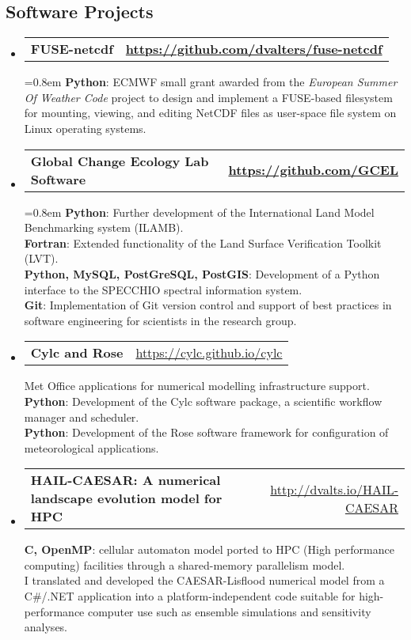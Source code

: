 \documentclass[10.5pt,a4]{article}
\makeatletter
\newcommand{\headerrow}[2]
{\begin{tabular*}{\linewidth}{l@{\extracolsep{\fill}}r}
	#1 &
	#2 \\
\end{tabular*}}
\newcommand{\CPP}
{C\nolinebreak[4]\hspace{-.05em}\raisebox{.22ex}{\footnotesize\bf ++}}
\makeatother
\begin{document}
\subsection*{Software Projects}
\begin{itemize}
	\parskip=0.1em

\item
\headerrow
		{\textbf{FUSE-netcdf}}
		{\textbf{\url{https://github.com/dvalters/fuse-netcdf}}}

		\parskip=0.8em
		\textbf{Python}: ECMWF small grant awarded from the \textit{European Summer Of Weather Code} project to design and implement a FUSE-based filesystem for mounting, viewing, and editing NetCDF files as user-space file system on Linux operating systems.

	\item
	\headerrow
		{\textbf{Global Change Ecology Lab Software}}
		{\textbf{\url{https://github.com/GCEL}}}

		\parskip=0.8em
     \textbf{Python}: Further development of the International Land Model Benchmarking system (ILAMB).\\
		 \textbf{Fortran}: Extended functionality of the Land Surface Verification Toolkit (LVT). \\
		 \textbf{Python, MySQL, PostGreSQL, PostGIS}: Development of a Python interface to the SPECCHIO spectral information system. \\
		 \textbf{Git}: Implementation of Git version control and support of best practices in software engineering for scientists in the research group.

	\item
	\headerrow
		{\textbf{Cylc and Rose}}
		{\url{https://cylc.github.io/cylc}}

		Met Office applications for numerical modelling infrastructure support. \\
		\textbf{Python}: Development of the Cylc software package, a scientific workflow manager and scheduler. \\ 
		\textbf{Python}: Development of the Rose software framework for configuration of meteorological applications. 

	\item
	\headerrow
		{\textbf{HAIL-CAESAR: A numerical landscape evolution model for HPC}}
		{\url{http://dvalts.io/HAIL-CAESAR}}

		\textbf{{\CPP}, OpenMP}: cellular automaton model ported to HPC (High performance computing) facilities through a shared-memory parallelism model. \\
		I translated and developed the CAESAR-Lisflood numerical model from a C{\#}/.NET application into a platform-independent code suitable for high-performance computer use such as ensemble simulations and sensitivity analyses. 



\end{itemize}
\end{document}
